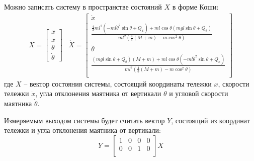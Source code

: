 Можно записать систему в пространстве состояний $X$ в форме Коши: 
\begin{equation}
    \begin{array}{cc}
        X = \begin{bmatrix} 
            x \\
            \dot{x} \\
            \theta \\
            \dot{\theta}
    \end{bmatrix} & 
    \dot{X} = \begin{bmatrix}
        \dot{x} \\
        \frac{\frac{4}{3}ml^2(-ml\dot{\theta}^2\sin\theta + Q_x) + ml\cos\theta(mgl\sin\theta + Q_{\theta})}{ml^2(\frac{4}{3}(M + m) - m\cos^2\theta)} \\ 
        \dot{\theta} \\
        \frac{(mgl\sin\theta + Q_{\theta})(M + m) + ml\cos\theta(-ml\dot{\theta}^2\sin\theta + Q_x) }{ml^2(\frac{4}{3}(M + m) - m\cos^2\theta)} \\ 
    \end{bmatrix}
    \end{array}
\end{equation}
где $X$ -- вектор состояния системы, состоящий координаты тележки $x$, скорости тележки $\dot{x}$, угла отклонения маятника от вертикали $\theta$ и угловой скорости маятника $\dot{\theta}$. 

Измеряемым выходом системы будет считать вектор $Y$, состоящий из координат тележки и угла отклонения маятника от вертикали:
\begin{equation}
    Y = \begin{bmatrix}
        1 & 0 & 0 & 0 \\
        0 & 0 & 1 & 0 \\ 
    \end{bmatrix} X
\end{equation}

